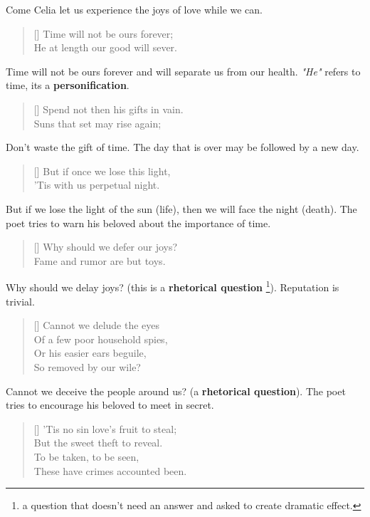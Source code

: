 Come Celia let us experience the joys of love while we can.

\begin{verse}[\versewidth]
{\fontverse
Time will not be ours forever;\\
He at length our good will sever.
}
\end{verse}

Time will not be ours forever and will separate us from 
our health. \textit{"He"} refers to time, its a \textbf{personification}.

\begin{verse}[\versewidth]
{\fontverse
Spend not then his gifts in vain.\\
Suns that set may rise again;
}
\end{verse}

Don't waste the gift of time. The day that is over 
may be followed by a new day.

\begin{verse}[\versewidth]
{\fontverse
But if once we lose this light,\\
'Tis with us perpetual night.
}
\end{verse}

But if we lose the light of the sun (life), then 
we will face the night (death). The poet tries to warn 
his beloved about the importance of time.


\newpage
\begin{verse}[\versewidth]
{\fontverse
Why should we defer our joys?\\
Fame and rumor are but toys.
}
\end{verse}

Why should we delay joys? (this is a \textbf{rhetorical question}
\footnote{a question that doesn't need an answer and asked to create dramatic effect.}).
Reputation is trivial. 

\begin{verse}[\versewidth]
{\fontverse
Cannot we delude the eyes\\
Of a few poor household spies,\\
Or his easier ears beguile,\\
So removed by our wile?
}
\end{verse}

Cannot we deceive the people around us? (a \textbf{rhetorical question}).
The poet tries to encourage his beloved to meet in secret.

\begin{verse}[\versewidth]
{\fontverse
'Tis no sin love's fruit to steal;\\
But the sweet theft to reveal.\\
To be taken, to be seen,\\
These have crimes accounted been.
}
\end{verse}


